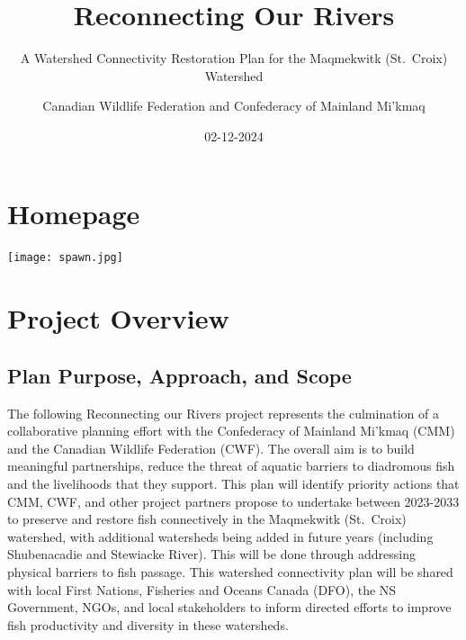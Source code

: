 \documentclass[
  letterpaper,
  DIV=11,
  numbers=noendperiod]{scrreprt}
\title{Reconnecting Our Rivers}
\subtitle{A Watershed Connectivity Restoration Plan for the Maqmekwitk
(St.~Croix) Watershed}
\author{Canadian Wildlife Federation and Confederacy of Mainland
Mi'kmaq}
\date{02-12-2024}
\renewcommand*\contentsname{Table of contents}
\newcommand\contentsname{Table of contents}
\begin{document}
\maketitle

\renewcommand*\contentsname{Table of contents}
{
\hypersetup{linkcolor=}
\setcounter{tocdepth}{1}
\tableofcontents
}

\chapter*{Homepage}\label{homepage}


\texttt{[image: spawn.jpg]}


\chapter*{Project Overview}\label{project-overview}


\section*{Plan Purpose, Approach, and
Scope}\label{plan-purpose-approach-and-scope}


The following Reconnecting our Rivers project represents the culmination
of a collaborative planning effort with the Confederacy of Mainland
Mi'kmaq (CMM) and the Canadian Wildlife Federation (CWF). The overall
aim is to build meaningful partnerships, reduce the threat of aquatic
barriers to diadromous fish and the livelihoods that they support. This
plan will identify priority actions that CMM, CWF, and other project
partners propose to undertake between 2023-2033 to preserve and restore
fish connectively in the Maqmekwitk (St.~Croix) watershed, with
additional watersheds being added in future years (including
Shubenacadie and Stewiacke River). This will be done through addressing
physical barriers to fish passage. This watershed connectivity plan will
be shared with local First Nations, Fisheries and Oceans Canada (DFO),
the NS Government, NGOs, and local stakeholders to inform directed
efforts to improve fish productivity and diversity in these
watersheds.\,
\end{document}
